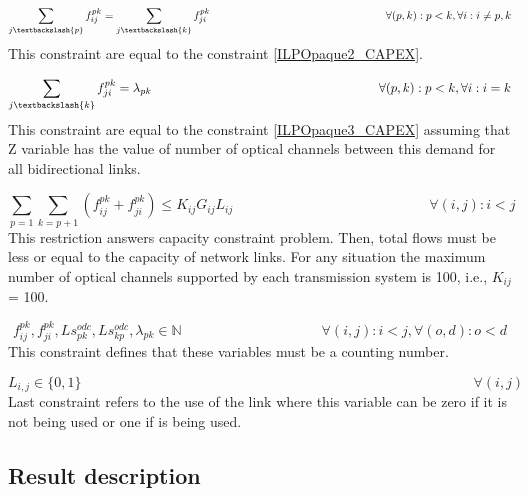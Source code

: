 \begin{equation}
\sum_{j\textbackslash \{p\}} f_{ij}^{pk} = \sum_{j\textbackslash \{k\}} f_{ji}^{pk} \qquad \qquad \qquad \qquad \qquad \qquad \qquad \qquad
\forall(p,k) : p < k, \forall i: i \neq p,k
\label{ILPTransluc7}
\end{equation}
\noindent
This constraint are equal to the constraint \ref{ILPOpaque2_CAPEX}.

\begin{equation}
\sum_{j\textbackslash \{k\}} f_{ji}^{pk} = \lambda_{pk}  \qquad \qquad \qquad \qquad \qquad \qquad \qquad \qquad \qquad
\forall(p,k) : p < k, \forall i: i = k
\label{ILPTransluc8}
\end{equation}
\noindent
This constraint are equal to the constraint \ref{ILPOpaque3_CAPEX} assuming that Z variable has the value of number of optical channels between this demand for all bidirectional links.

\begin{equation}
\sum_{p=1} \sum_{k=p+1} \left( f_{ij}^{pk} + f_{ji}^{pk}\right) \leq K_{ij} G_{ij} L_{ij} \qquad \qquad \qquad \qquad \qquad \qquad \qquad
\forall (i,j) : i < j
\label{ILPTransluc9}
\end{equation}
\noindent
This restriction answers capacity constraint problem. Then, total flows must be less or equal to the capacity of network links. For any situation the maximum number of optical channels supported by each transmission system is 100, i.e., $K_{ij}$ = 100.

\begin{equation}
f_{ij}^{pk} , f_{ji}^{pk} , Ls_{pk}^{odc} , Ls_{kp}^{odc} , \lambda_{pk} \in \mathbb{N}   \qquad \qquad \qquad \qquad \qquad
\forall(i,j) : i < j, \forall(o,d) : o < d
\label{ILPTransluc10}
\end{equation}
\noindent
This constraint defines that these variables must be a counting number.

\begin{equation}
L_{i,j} \in \{0,1\} \qquad \qquad \qquad \qquad \qquad \qquad \qquad \qquad \qquad \qquad \qquad \qquad \qquad \qquad
\forall(i,j)
\label{ILPTransluc11}
\end{equation}
\noindent
Last constraint refers to the use of the link where this variable can be zero if it is not being used or one if is being used.

\subsection{Result description}

